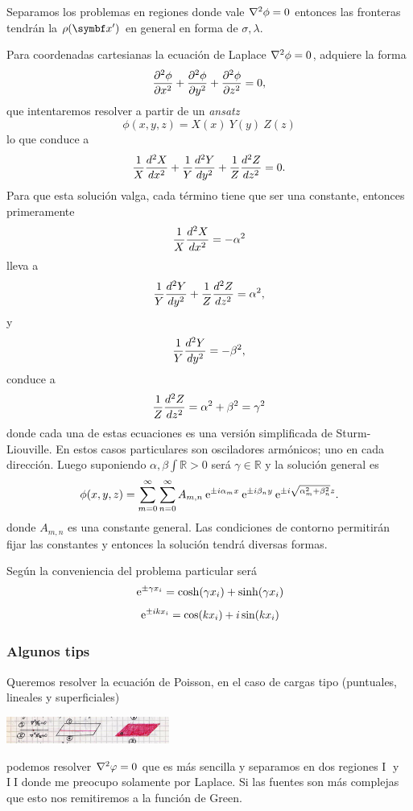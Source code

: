 \documentclass[10pt,oneside]{CBFT_book}
\begin{document}
Separamos los problemas en regiones donde vale $\lapm{\phi} = 0$ entonces las fronteras tendrán la
$\rho(\vb{x}')$ en general en forma de $\sigma,\lambda$.

Para coordenadas cartesianas la ecuación de Laplace $\lapm{\phi} = 0$, adquiere la forma
\[
	\dpar[2]{\phi}{x} + \dpar[2]{\phi}{y}  + \dpar[2]{\phi}{z}  = 0,
\]
que intentaremos resolver a partir de un {\it ansatz} 
\[
	\phi(x,y,z) = X(x) \: Y(y) \: Z(z)
\]
lo que conduce a 
\[
	\frac{1}{X}\dtot[2]{X}{x} + \frac{1}{Y}\dtot[2]{Y}{y} + \frac{1}{Z}\dtot[2]{Z}{z} = 0.
\]
Para que esta solución valga, cada término tiene que ser una constante, entonces primeramente
\[
	\frac{1}{X} \dtot[2]{X}{x} = - \alpha^2
\]
lleva a 
\[
	\frac{1}{Y}\dtot[2]{Y}{y} + \frac{1}{Z}\dtot[2]{Z}{z} = \alpha^2,
\]
y 
\[
	\frac{1}{Y} \dtot[2]{Y}{y} = - \beta^2,
\]
conduce a
\[
	\frac{1}{Z}\dtot[2]{Z}{z} = \alpha^2 + \beta^2 = \gamma^2
\]
donde cada una de estas ecuaciones es una versión simplificada de Sturm-Liouville. En estos
casos particulares son osciladores armónicos; uno en cada dirección.
Luego suponiendo $\alpha,\beta \int \mathbb{R}>0$ será $\gamma \in \mathbb{R}$ y la solución 
general es
\[
	\phi(x,y,z) = \sum_{m=0}^\infty \sum_{n=0}^\infty A_{m,n} \euler^{\pm i\alpha_m x}
	\euler^{\pm i\beta_n y} \euler^{\pm i\sqrt{\alpha_m^2 + \beta_n^2 }z}.
\]
donde $A_{m,n}$ es una constante general. 
Las condiciones de contorno permitirán fijar las constantes y entonces la solución tendrá
diversas formas. 

Según la conveniencia del problema particular será
\[
	\euler^{\pm \gamma x_i } = \cosh( \gamma x_i ) + \sinh( \gamma x_i )
\]
\[
	\euler^{\pm i k x_i } = \cos( k x_i ) + i \sin( k x_i )
\]

\subsubsection{Algunos tips}

Queremos resolver la ecuación de Poisson, 
en el caso de cargas tipo (puntuales, lineales y superficiales)

\includegraphics[width=0.4\textwidth]{images/fig_ft1_tips_separacion.jpg}

podemos resolver $\nabla^2 \vp = 0$ que es más sencilla y separamos en dos
regiones \textcircled{I} y \textcircled{II} donde me preocupo solamente
por Laplace.
Si las fuentes son más complejas que esto nos remitiremos a la función
de Green.
\end{document}
